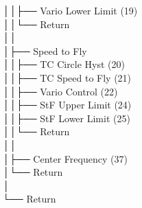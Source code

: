 │\hspace{2em}│\hspace{2em}├── Vario Lower Limit (19) \\
│\hspace{2em}│\hspace{2em}└── Return \\
│\hspace{2em}│\hspace{2em} \\
│\hspace{2em}├── Speed to Fly \\
│\hspace{2em}│\hspace{2em}├── TC Circle Hyst (20) \\
│\hspace{2em}│\hspace{2em}├── TC Speed to Fly (21) \\
│\hspace{2em}│\hspace{2em}├── Vario Control (22) \\
│\hspace{2em}│\hspace{2em}├── StF Upper Limit (24) \\
│\hspace{2em}│\hspace{2em}├── StF Lower Limit (25) \\
│\hspace{2em}│\hspace{2em}└── Return \\
│\hspace{2em}│\hspace{2em} \\
│\hspace{2em}├── Center Frequency (37) \\
│\hspace{2em}└── Return \\
│\hspace{2em} \\
└── Return \\
\sffamily
